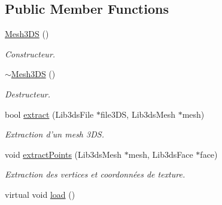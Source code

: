 \subsection*{Public Member Functions}
\begin{DoxyCompactItemize}
\item 
\hypertarget{classMesh3DS_abdfac0ddfc9dd72b5bc3504996c07a1c}{\hyperlink{classMesh3DS_abdfac0ddfc9dd72b5bc3504996c07a1c}{Mesh3\-D\-S} ()}\label{classMesh3DS_abdfac0ddfc9dd72b5bc3504996c07a1c}

\begin{DoxyCompactList}\small\item\em Constructeur. \end{DoxyCompactList}\item 
\hypertarget{classMesh3DS_a56ab33cfc6d63a288226993f96b85af8}{\hyperlink{classMesh3DS_a56ab33cfc6d63a288226993f96b85af8}{$\sim$\-Mesh3\-D\-S} ()}\label{classMesh3DS_a56ab33cfc6d63a288226993f96b85af8}

\begin{DoxyCompactList}\small\item\em Destructeur. \end{DoxyCompactList}\item 
\hypertarget{classMesh3DS_a15725546099ea3a351229d875738803d}{bool \hyperlink{classMesh3DS_a15725546099ea3a351229d875738803d}{extract} (Lib3ds\-File $\ast$file3\-D\-S, Lib3ds\-Mesh $\ast$mesh)}\label{classMesh3DS_a15725546099ea3a351229d875738803d}

\begin{DoxyCompactList}\small\item\em Extraction d'un mesh 3\-D\-S. \end{DoxyCompactList}\item 
\hypertarget{classMesh3DS_a0a4b9d9c4be4cd15edb205c52939dd9b}{void \hyperlink{classMesh3DS_a0a4b9d9c4be4cd15edb205c52939dd9b}{extract\-Points} (Lib3ds\-Mesh $\ast$mesh, Lib3ds\-Face $\ast$face)}\label{classMesh3DS_a0a4b9d9c4be4cd15edb205c52939dd9b}

\begin{DoxyCompactList}\small\item\em Extraction des vertices et coordonnées de texture. \end{DoxyCompactList}\item 
\hypertarget{classMesh3DS_a86b0028e6af06db5388bba8d962de91f}{virtual void \hyperlink{classMesh3DS_a86b0028e6af06db5388bba8d962de91f}{load} ()}\label{classMesh3DS_a86b0028e6af06db5388bba8d962de91f}


\end{DoxyCompactItemize}
